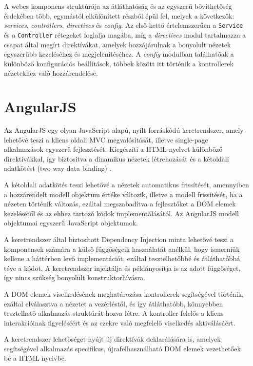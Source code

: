 A webes komponens struktúrája az átláthatóság és az egyszerű bővíthetőség érdekében több, egymástól elkülönített részből épül fel, melyek a következők: \textit{services}, \textit{controllers}, \textit{directives} és \textit{config}. Az első kettő értelemszerűen a \texttt{Service} és a \texttt{Controller} rétegeket foglalja magába, míg a \textit{directives} modul tartalmazza a csapat által megírt direktívákat, amelyek hozzájárulnak a bonyolult nézetek egyszerűbb kezeléséhez és megjelenítéséhez. A \textit{config} modulban találhatóak a különböző konfigurációs beállítások, többek között itt történik a kontrollerek nézetekhez való hozzárendelése. 

\section{AngularJS}
\label{sec:angularjs}
Az AngularJS egy olyan JavaScript alapú, nyílt forráskódú keretrendszer, amely lehetővé teszi a kliens oldali MVC megvalósítását, illetve single-page alkalmazások egyszerű fejlesztését. Kiegészíti a HTML nyelvet különböző direktívákkal, így biztosítva a dinamikus nézetek létrehozását és a kétoldali adatkötést (two way data binding) \cite{AngularJS}.

A kétoldali adatkötés teszi lehetővé a nézetek automatikus frissítését, amennyiben a hozzárendelt modell objektum értéke változik, illetve a modell frissítését, ha a nézeten történik változás, ezáltal megszabadítva a fejlesztőket a DOM elemek kezelésétől és az ehhez tartozó kódok implementálásától. Az AngularJS modell objektumai egyszerű JavaScript objektumok.

A keretrendszer által biztosított Dependency Injection minta lehetővé teszi a komponensek számára a külső függőségeik használatát anélkül, hogy ismerniük kellene  a háttérben levő implementációt, ezáltal tesztelhetőbbé és átláthatóbbá téve a kódot. A keretrendszer injektálja és példányosítja is az adott függőséget, így nincs szükség bonyolult konstruktorhívásra.     

A DOM elemek viselkedésének meghatározása kontrollerek segítségével történik, ezáltal elválasztva a nézetet a vezérléstől, és így átláthatóbb, könnyebben tesztelhető alkalmazás-struktúrát hozva létre. A kontroller felelős a kliens interakcióinak figyeléséért és az ezekre való megfelelő viselkedés aktiválásáért. 



A keretrendszer lehetőséget nyújt új direktívák deklarálására is, amelyek segítségével alkalmazás specifikus, újrafelhasználható DOM elemek vezethetőek be a HTML nyelvbe. 


